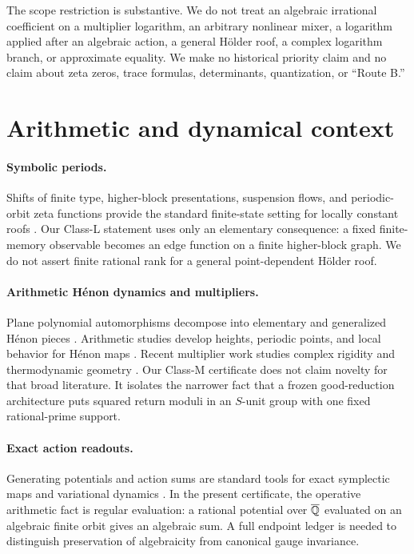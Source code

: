 \documentclass[11pt]{article}
\theoremstyle{definition}
\theoremstyle{remark}
\begin{document}
The scope restriction is substantive.  We do not treat an algebraic
irrational coefficient on a multiplier logarithm, an arbitrary nonlinear
mixer, a logarithm applied after an algebraic action, a general H\"older roof,
a complex logarithm branch, or approximate equality.  We make no historical
priority claim and no claim about zeta zeros, trace formulas, determinants,
quantization, or ``Route B.''

\section{Arithmetic and dynamical context}
\label{sec:context}

\paragraph{Symbolic periods.}
Shifts of finite type, higher-block presentations, suspension flows, and
periodic-orbit zeta functions provide the standard finite-state setting for
locally constant roofs \citep{parry_pollicott_1990,lind_marcus_1995}.  Our
Class-L statement uses only an elementary consequence: a fixed finite-memory
observable becomes an edge function on a finite higher-block graph.  We do
not assert finite rational rank for a general point-dependent H\"older roof.

\paragraph{Arithmetic H\'enon dynamics and multipliers.}
Plane polynomial automorphisms decompose into elementary and generalized
H\'enon pieces \citep{friedland_milnor_1989}.  Arithmetic studies develop
heights, periodic points, and local behavior for H\'enon maps
\citep{silverman_1994,ingram_2014,hsia_kawaguchi_2018}.  Recent multiplier
work studies complex rigidity and thermodynamic geometry
\citep{cantat_dujardin_2026,bianchi_he_2026}.  Our Class-M certificate does
not claim novelty for that broad literature.  It isolates the narrower fact
that a frozen good-reduction architecture puts squared return moduli in an
$S$-unit group with one fixed rational-prime support.

\paragraph{Exact action readouts.}
Generating potentials and action sums are standard tools for exact symplectic
maps and variational dynamics \citep{delshams_ramirezros_1997,
bialy_tsodikovich_2023}.  In the present certificate, the operative arithmetic
fact is regular evaluation: a rational potential over $\overline{\mathbb Q}$ evaluated on an
algebraic finite orbit gives an algebraic sum.  A full endpoint ledger is
needed to distinguish preservation of algebraicity from canonical gauge
invariance.
\end{document}
